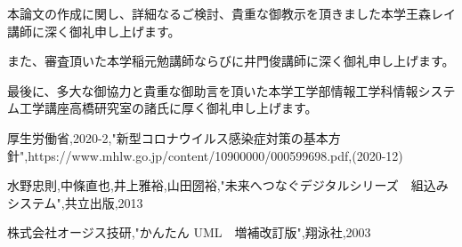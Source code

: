 本論文の作成に関し、詳細なるご検討、貴重な御教示を頂きました本学王森レイ講師に深く御礼申し上げます。

また、審査頂いた本学稲元勉講師ならびに井門俊講師に深く御礼申し上げます。

最後に、多大な御協力と貴重な御助言を頂いた本学工学部情報工学科情報システム工学講座高橋研究室の諸氏に厚く御礼申し上げます。


\begin{thebibliography}{99}

厚生労働省,2020-2,"新型コロナウイルス感染症対策の基本方針",https://www.mhlw.go.jp/content/10900000/000599698.pdf,(2020-12) 

水野忠則,中條直也,井上雅裕,山田圀裕,"未来へつなぐデジタルシリーズ　組込みシステム",共立出版,2013

株式会社オージス技研,"かんたん UML　増補改訂版",翔泳社,2003

\end{thebibliography}

